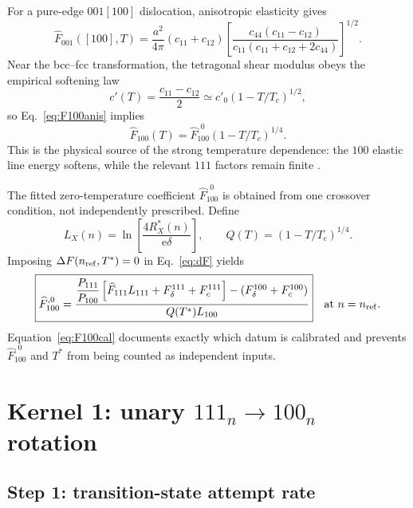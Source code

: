 \documentclass[11pt,a4paper]{article}
\newcommand{\e}{\mathrm e}
\begin{document}
For a pure-edge $001[100]$ dislocation, anisotropic elasticity gives
\begin{equation}
 \widehat F_{001}([100],T)=\frac{a^2}{4\pi}(c_{11}+c_{12})
 \left[\frac{c_{44}(c_{11}-c_{12})}
 {c_{11}(c_{11}+c_{12}+2c_{44})}\right]^{1/2}.                        \label{eq:F100anis}
\end{equation}
Near the bcc--fcc transformation, the tetragonal shear modulus obeys the
empirical softening law
\begin{equation}
 c'(T)=\frac{c_{11}-c_{12}}2\simeq c'_0(1-T/T_c)^{1/2},                \label{eq:cprime}
\end{equation}
so Eq.~\eqref{eq:F100anis} implies
\begin{equation}
 \widehat F_{100}(T)=\widehat F_{100}^{,0}
 (1-T/T_c)^{1/4}.                                                     \label{eq:F100T}
\end{equation}
This is the physical source of the strong temperature dependence: the $100$
elastic line energy softens, while the relevant $111$ factors remain finite
\citep{DudarevBullough2008}.

The fitted zero-temperature coefficient $\widehat F_{100}^{,0}$ is obtained
from one crossover condition, not independently prescribed.  Define
\begin{equation}
 L_X(n)=\ln\!\left[\frac{4R_X^*(n)}{\e\delta}\right],\qquad
 Q(T)=(1-T/T_c)^{1/4}.                                                \label{eq:LQ}
\end{equation}
Imposing $\Delta F(n_{\rm ref},T^*)=0$ in Eq.~\eqref{eq:dF} yields
\begin{equation}
 \boxed{
 \widehat F_{100}^{,0}=
 \frac{\dfrac{P_{111}}{P_{100}}
 \left[\widehat F_{111}L_{111}+F_\delta^{111}+F_c^{111}\right]
 -(F_\delta^{100}+F_c^{100})}
 {Q(T^*)L_{100}} }
 \quad\text{at }n=n_{\rm ref}.                                      \label{eq:F100cal}
\end{equation}
Equation~\eqref{eq:F100cal} documents exactly which datum is calibrated and
prevents $\widehat F_{100}^{,0}$ and $T^*$ from being counted as independent
inputs.

\section{Kernel 1: unary $111_n\rightarrow100_n$ rotation}
\label{sec:unary}

\subsection{Step 1: transition-state attempt rate}
\end{document}
